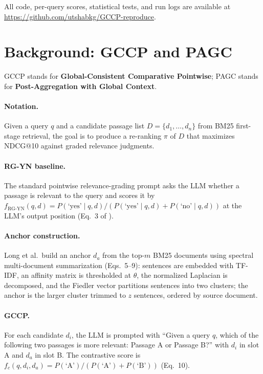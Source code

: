 \documentclass[sigconf]{acmart}
\begin{document}
All code, per-query scores, statistical tests, and run logs are
available at \url{https://github.com/utshabkg/GCCP-reproduce}.

\section{Background: GCCP and PAGC}

GCCP stands for \textbf{Global-Consistent Comparative Pointwise};
PAGC stands for \textbf{Post-Aggregation with Global Context}.

\paragraph{Notation.} Given a query $q$ and a candidate passage list
$D = \{d_1, \dots, d_n\}$ from BM25 first-stage retrieval, the goal is
to produce a re-ranking $\pi$ of $D$ that maximizes NDCG@10 against
graded relevance judgments.

\paragraph{RG-YN baseline.} The standard pointwise relevance-grading
prompt asks the LLM whether a passage is relevant to the query and
scores it by $f_{\text{RG-YN}}(q,d) = P(\text{`yes'} \mid q,d) /
(P(\text{`yes'} \mid q,d) + P(\text{`no'} \mid q,d))$ at the LLM's
output position (Eq.~3 of \cite{long2025precise}).

\paragraph{Anchor construction.} Long et al.\ build an anchor $d_a$
from the top-$m$ BM25 documents using spectral
multi-document summarization (Eqs.~5--9): sentences are embedded with
TF-IDF, an affinity matrix is thresholded at $\theta$, the normalized
Laplacian is decomposed, and the Fiedler vector partitions sentences
into two clusters; the anchor is the larger cluster trimmed to $z$
sentences, ordered by source document.

\paragraph{GCCP.} For each candidate $d_i$, the LLM is prompted with
``Given a query $q$, which of the following two passages is more
relevant: Passage A or Passage B?'' with $d_i$ in slot A and $d_a$ in
slot B. The contrastive score is
$f_c(q,d_i,d_a) = P(\text{`A'}) / (P(\text{`A'}) + P(\text{`B'}))$
(Eq.~10).
\end{document}
